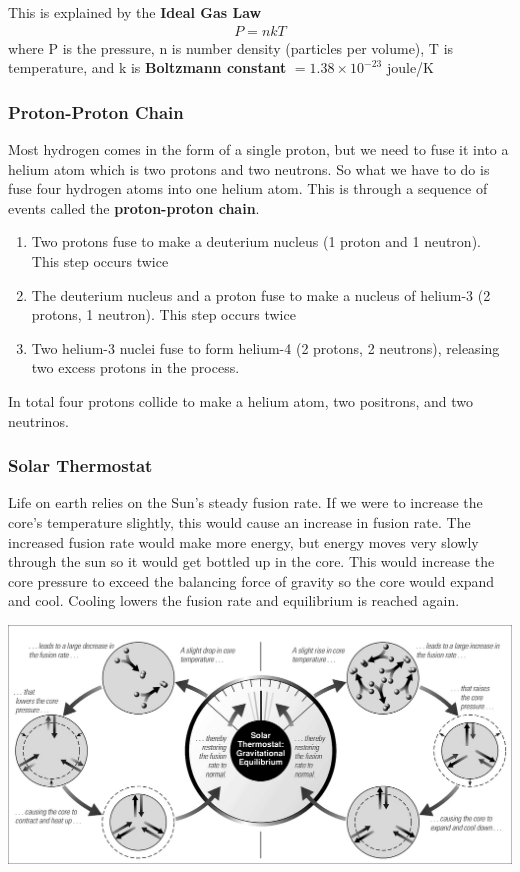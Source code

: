 \documentclass[12pt]{article}
\begin{document}
This is explained by the \textbf{Ideal Gas Law}
\begin{align*}
    P = nkT
\end{align*}
where P is the pressure, n is number density (particles per volume), T is temperature, and k is \textbf{Boltzmann constant} $=1.38 \times 10^{-23}$ joule/K

\subsubsection{Proton-Proton Chain}
Most hydrogen comes in the form of a single proton, but we need to fuse it into a helium atom which is two protons and two neutrons. So what we have to do is fuse four hydrogen atoms into one helium atom. This is through a sequence of events called the \textbf{proton-proton chain}.
\begin{enumerate}
    \item Two protons fuse to make a deuterium nucleus (1 proton and 1 neutron). This step occurs twice
    \item The deuterium nucleus and a proton fuse to make a nucleus of helium-3 (2 protons, 1 neutron). This step occurs twice
    \item Two helium-3 nuclei fuse to form helium-4 (2 protons, 2 neutrons), releasing two excess protons in the process.
\end{enumerate}
In total four protons collide to make a helium atom, two positrons, and two neutrinos.

\subsubsection{Solar Thermostat}
Life on earth relies on the Sun's steady fusion rate. If we were to increase the core's temperature slightly, this would cause an increase in fusion rate. The increased fusion rate would make more energy, but energy moves very slowly through the sun so it would get bottled up in the core. This would increase the core pressure to exceed the balancing force of gravity so the core would expand and cool. Cooling lowers the fusion rate and equilibrium is reached again.

\includegraphics[scale=0.5]{solarThermostat}
\end{document}
